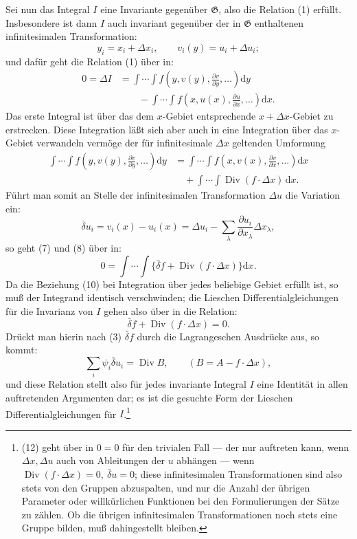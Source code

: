 \documentclass[11pt]{article}
\newcommand{\D}{\Delta}
\providecommand{\dd}{\mathrm d}
\providecommand{\Div}{\operatorname{Div}}
\providecommand{\G}{\mathfrak G}
\providecommand{\bd}{\bar{\delta}}
\providecommand{\p}{\partial}
\providecommand{\p}{\partial}
\providecommand{\dd}{\mathrm d}
\begin{document}
Sei nun das Integral \(I\) eine Invariante gegenüber \(\G\), also die Relation (1) erfüllt. Insbesondere ist dann \(I\) auch invariant gegenüber der in \(\G\) enthaltenen infinitesimalen Transformation:
\[
y_i=x_i+\D x_i,\qquad v_i(y)=u_i+\D u_i;
\]
und dafür geht die Relation (1) über in:
\begin{equation}
\begin{aligned}
0=\D I
&=\int\!\cdots\!\int f\!\left(y,v(y),\frac{\p v}{\p y},\ldots\right)\dd y\\
&\qquad-\int\!\cdots\!\int f\!\left(x,u(x),\frac{\p u}{\p x},\ldots\right)\dd x.
\end{aligned}
\tag{7}
\end{equation}
Das erste Integral ist über das dem \(x\)-Gebiet entsprechende \(x+\D x\)-Gebiet zu erstrecken. Diese Integration läßt sich aber auch in eine Integration über das \(x\)-Gebiet verwandeln vermöge der für infinitesimale \(\D x\) geltenden Umformung
\begin{equation}
\begin{aligned}
\int\!\cdots\!\int f\!\left(y,v(y),\frac{\p v}{\p y},\ldots\right)\dd y
&=\int\!\cdots\!\int f\!\left(x,v(x),\frac{\p v}{\p x},\ldots\right)\dd x\\
&\quad+\int\!\cdots\!\int \Div(f\cdot \D x)\,\dd x.
\end{aligned}
\tag{8}
\end{equation}
Führt man somit an Stelle der infinitesimalen Transformation \(\D u\) die Variation ein:
\begin{equation}
\bd u_i=v_i(x)-u_i(x)=\D u_i-\sum_\lambda\frac{\p u_i}{\p x_\lambda}\D x_\lambda,
\tag{9}
\end{equation}
so geht (7) und (8) über in:
\begin{equation}
0=\int\!\cdots\!\int\{\bd f+\Div(f\cdot\D x)\}\dd x.
\tag{10}
\end{equation}
Da die Beziehung (10) bei Integration über jedes beliebige Gebiet erfüllt ist, so muß der Integrand identisch verschwinden; die Lieschen Differentialgleichungen für die Invarianz von \(I\) gehen also über in die Relation:
\begin{equation}
\bd f+\Div(f\cdot\D x)=0.
\tag{11}
\end{equation}
Drückt man hierin nach (3) \(\bd f\) durch die Lagrangeschen Ausdrücke aus, so kommt:
\begin{equation}
\sum_i\psi_i\bd u_i=\Div B,\qquad (B=A-f\cdot\D x),
\tag{12}
\end{equation}
und diese Relation stellt also für jedes invariante Integral \(I\) eine Identität in allen auftretenden Argumenten dar; es ist die gesuchte Form der Lieschen Differentialgleichungen für \(I\).\footnote{(12) geht über in \(0=0\) für den trivialen Fall --- der nur auftreten kann, wenn \(\D x,\D u\) auch von Ableitungen der \(u\) abhängen --- wenn \(\Div(f\cdot\D x)=0,\ \bd u=0\); diese infinitesimalen Transformationen sind also stets von den Gruppen abzuspalten, und nur die Anzahl der übrigen Parameter oder willkürlichen Funktionen bei den Formulierungen der Sätze zu zählen. Ob die übrigen infinitesimalen Transformationen noch stets eine Gruppe bilden, muß dahingestellt bleiben.}
\end{document}
